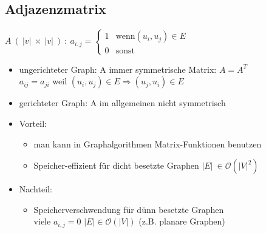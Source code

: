 \documentclass[11pt, fleqn]{scrreprt}
\newcommand{\bigO}[0]{\mathcal{O}}
\begin{document}
    \subsection*{Adjazenzmatrix}
     $ A\  (\ |v|\ \times \ |v|\ )\ :\  a_{i,j} = \begin{cases} 1 & \text{wenn} (u_i, u_j) \in E \\
    0  & \text{sonst}\end{cases}$
    \begin{itemize}
        \item ungerichteter Graph: A immer symmetrische Matrix: $A = A^T$ \\
        \hspace*{1cm} $a_{ij} = a_{ji}$ \hspace*{2mm} weil \hspace*{2mm} $(u_i, u_j) \in E \Rightarrow (u_j, u_i) \in E$
        \item gerichteter Graph: A im allgemeinen nicht symmetrisch
        \item Vorteil:
        \begin{itemize}
            \item man kann in Graphalgorithmen Matrix-Funktionen benutzen
            \item Speicher-effizient für dicht besetzte Graphen $| E | \ \in \bigO{}(|V|^2)$
        \end{itemize}
        \item Nachteil:
        \begin{itemize}
            \item Speicherverschwendung für dünn besetzte Graphen \\
            viele $a_{i,j} = 0$ \hspace*{1cm} $|E| \in \bigO{}(|V|)$ \hspace*{1cm} (z.B. planare Graphen)
        \end{itemize}
    \end{itemize}
\end{document}
